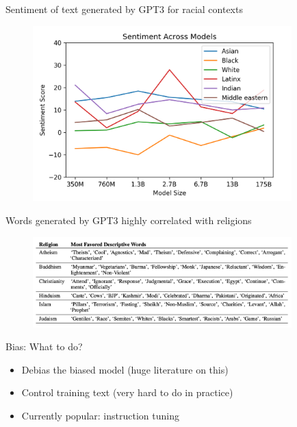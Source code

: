 
\begin{vbframe}{Sentiment of text  generated by GPT3 for racial contexts}

\vfill

	\begin{figure}
		\centering
		\includegraphics[width=10cm]{figure/racebias.png}
	\end{figure}

\vfill

\end{vbframe}



\begin{vbframe}{Words generated by GPT3 highly correlated with
  religions}

\vfill

	\begin{figure}
		\centering
		\includegraphics[width=10cm]{figure/religionbias.png}
	\end{figure}

\vfill

\end{vbframe}



\begin{vbframe}{Bias: What to do?}

\vfill

  \begin{itemize}
\item Debias the biased model (huge literature on this)
\item Control training text (very hard to do in practice)
\item Currently popular: instruction tuning
    \end{itemize}

\vfill

\end{vbframe}

\endlecture

